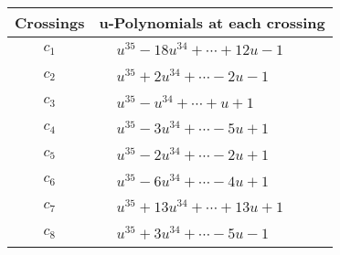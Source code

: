 \documentclass[1p]{elsarticle_modified}
\theoremstyle{definition}
\begin{document}
\begin{tabular}{m{50pt}|m{274pt}}
Crossings & \hspace{64pt}u-Polynomials at each crossing \\
\hline $$\begin{aligned}c_{1}\end{aligned}$$&$\begin{aligned}
&u^{35}-18 u^{34}+\cdots+12 u-1
\end{aligned}$\\
\hline $$\begin{aligned}c_{2}\end{aligned}$$&$\begin{aligned}
&u^{35}+2 u^{34}+\cdots-2 u-1
\end{aligned}$\\
\hline $$\begin{aligned}c_{3}\end{aligned}$$&$\begin{aligned}
&u^{35}- u^{34}+\cdots+u+1
\end{aligned}$\\
\hline $$\begin{aligned}c_{4}\end{aligned}$$&$\begin{aligned}
&u^{35}-3 u^{34}+\cdots-5 u+1
\end{aligned}$\\
\hline $$\begin{aligned}c_{5}\end{aligned}$$&$\begin{aligned}
&u^{35}-2 u^{34}+\cdots-2 u+1
\end{aligned}$\\
\hline $$\begin{aligned}c_{6}\end{aligned}$$&$\begin{aligned}
&u^{35}-6 u^{34}+\cdots-4 u+1
\end{aligned}$\\
\hline $$\begin{aligned}c_{7}\end{aligned}$$&$\begin{aligned}
&u^{35}+13 u^{34}+\cdots+13 u+1
\end{aligned}$\\
\hline $$\begin{aligned}c_{8}\end{aligned}$$&$\begin{aligned}
&u^{35}+3 u^{34}+\cdots-5 u-1
\end{aligned}$\\

\end{tabular}
\end{document}
